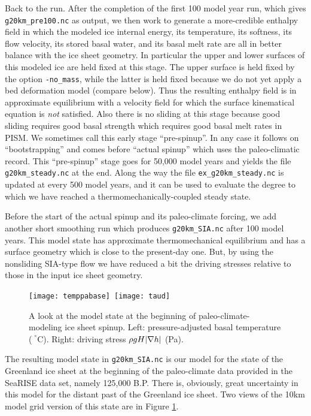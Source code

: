 Back to the run.  After the completion of the first 100 model year run, which gives \texttt{g20km_pre100.nc} as output, we then work to generate a more-credible enthalpy field in which the modeled ice internal energy, its temperature, its softness, its flow velocity, its stored basal water, and its basal melt rate are all in better balance with the ice sheet geometry.  In particular the upper and lower surfaces of this modeled ice are held fixed at this stage.  The upper surface is held fixed by the option \texttt{-no_mass}, while the latter is held fixed because we do not yet apply a bed deformation model (compare below).  Thus the resulting enthalpy field is in approximate equilibrium with a velocity field for which the surface kinematical equation \cite{Fowler} is \emph{not} satisfied.  Also there is no sliding at this stage because good sliding requires good basal strength which requires good basal melt rates in PISM.  We sometimes call this early stage ``pre-spinup''.  In any case it follows on ``bootstrapping'' and comes before ``actual spinup'' which uses the paleo-climatic record.  This ``pre-spinup'' stage goes for 50,000 model years and yields the file \texttt{g20km_steady.nc} at the end.  Along the way the file \texttt{ex_g20km_steady.nc} is updated at every 500 model years, and it can be used to evaluate the degree to which we have reached a thermomechanically-coupled steady state.

Before the start of the actual spinup and its paleo-climate forcing, we add another short smoothing run which produces \texttt{g20km_SIA.nc} after 100 model years.  This model state has approximate thermomechanical equilibrium and has a surface geometry which is close to the present-day one.  But, by using the nonsliding SIA-type flow we have reduced a bit the driving stresses relative to those in the input ice sheet geometry.

\begin{figure}[ht]
\centering
\mbox{\texttt{[image: temppabase]}
  \qquad \texttt{[image: taud]}}
\caption{A look at the model state at the beginning of paleo-climate-modeling ice sheet spinup.  Left: pressure-adjusted basal temperature ($\phantom{|}^\circ$C).  Right: driving stress $\rho g H |\nabla h|$ (Pa).}
\label{fig:sr-spinstart}
\end{figure}

The resulting model state in \texttt{g20km_SIA.nc} is our model for the state of the Greenland ice sheet at the beginning of the paleo-climate data provided in the SeaRISE data set, namely 125,000 B.P.  There is, obviously, great uncertainty in this model for the distant past of the Greenland ice sheet.  Two views of the 10km model grid version of this state are in Figure \ref{fig:sr-spinstart}.

